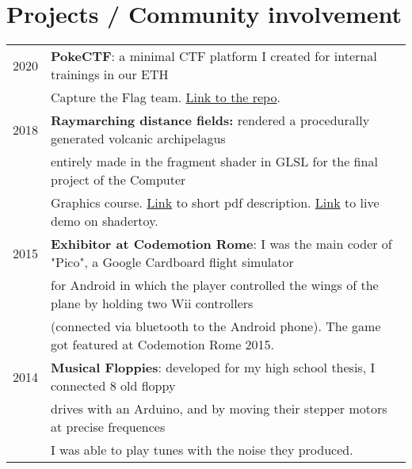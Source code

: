 \documentclass[a4paper,10pt]{article} %
\newcommand{\mh}[0]{{\hspace*{-1em}}}
\newcommand{\mH}[0]{{\hspace*{0.5em}}}
\begin{document}
\section{Projects / Community involvement}
\begin{tabular}{ll}
2020 \mH &  \mh \textbf{PokeCTF}: a minimal CTF platform I created for internal trainings in our ETH \\
	 & Capture the Flag team. \href{https://www.github.com/cyanpencil/pokectf}{Link to the repo}.  \\
2018  &  \mh \textbf{Raymarching distance fields:} rendered a procedurally generated volcanic archipelagus \\
     & entirely made in the fragment shader in GLSL for the final project of the Computer \\
     & Graphics course. \href{https://drive.google.com/open?id=1U4zynGm8o4i8VodnaWTOjgoayj9rhega}{Link} to short pdf description. 
       \href{https://www.shadertoy.com/view/4dcyzM}{Link} to live demo on shadertoy. \\
2015 & \mh \textbf{Exhibitor at Codemotion Rome}: I was the main coder of "Pico", a Google Cardboard flight simulator \\
     & for Android in which the player controlled the wings of the plane by holding two Wii controllers \\
     & (connected via bluetooth to the Android phone). The game got featured at Codemotion Rome 2015. \\
2014 & \mh \textbf{Musical Floppies}: developed for my high school thesis, I connected 8 old floppy \\
     & drives with an Arduino, and by moving their stepper motors at precise frequences \\
     & I was able to play tunes with the noise they produced.\\
\end{tabular}
\end{document}
